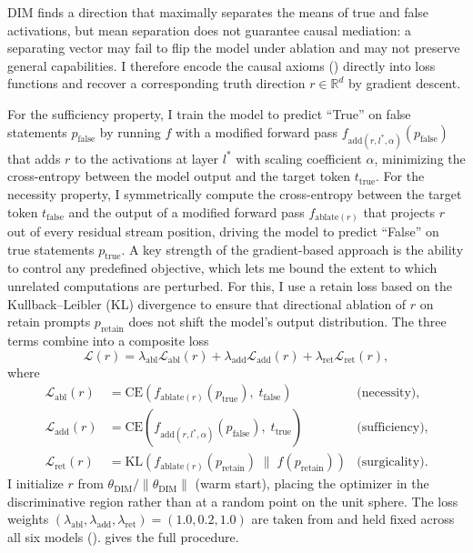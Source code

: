 \documentclass[sn-basic]{sn-jnl}
\newcommand{\dimv}{\theta_{\text{DIM}}}
\newcommand{\fablate}[1][\cdot]{f_{\text{ablate}(#1)}}
\newcommand{\fadd}[1][\cdot]{f_{\text{add}(#1,\alpha)}}
\newcommand{\Labl}{\mathcal{L}_{\text{abl}}}
\newcommand{\Ladd}{\mathcal{L}_{\text{add}}}
\newcommand{\Lret}{\mathcal{L}_{\text{ret}}}
\begin{document}
DIM finds a direction that maximally separates the means of true and false
activations, but mean separation does not guarantee causal mediation: a
separating vector may fail to flip the model under ablation and may not
preserve general capabilities. I therefore encode the causal axioms
() directly into loss functions and recover a corresponding
truth direction $r \in \mathbb{R}^{d}$ by gradient descent.

For the sufficiency property, I train the model to predict ``True'' on false
statements $p_{\text{false}}$ by running $f$ with a modified forward pass
$\fadd[r,l^{*}](p_{\text{false}})$ that adds $r$ to the activations at layer
$l^{*}$ with scaling coefficient $\alpha$, minimizing the cross-entropy between
the model output and the target token $t_{\text{true}}$. For the necessity
property, I symmetrically compute the cross-entropy between the target token
$t_{\text{false}}$ and the output of a modified forward pass
$\fablate[r]$ that projects $r$ out of every residual stream position,
driving the model to predict ``False'' on true statements $p_{\text{true}}$.
A key strength of the gradient-based approach is the ability to control any
predefined objective, which lets me bound the extent to which unrelated
computations are perturbed. For this, I use a retain loss based on the
Kullback--Leibler (KL) divergence to ensure that directional ablation of $r$
on retain prompts $p_{\text{retain}}$ does not shift the model's output
distribution. The three terms combine into a composite loss
\[
\mathcal{L}(r) =
   \lambda_{\text{abl}} \Labl(r)
 + \lambda_{\text{add}} \Ladd(r)
 + \lambda_{\text{ret}} \Lret(r),
\]
where
\begin{align*}
\Labl(r) &= \mathrm{CE}\!\left(f_{\text{ablate}(r)}(p_{\text{true}}),\;
                                t_{\text{false}}\right)
  &\text{(necessity)},\\
\Ladd(r) &= \mathrm{CE}\!\left(f_{\text{add}(r,l^{*},\alpha)}(p_{\text{false}}),\;
                                t_{\text{true}}\right)
  &\text{(sufficiency)},\\
\Lret(r) &= \mathrm{KL}\!\left(f_{\text{ablate}(r)}(p_{\text{retain}})\;\|\;
                                f(p_{\text{retain}})\right)
  &\text{(surgicality)}.
\end{align*}
I initialize $r$ from $\dimv / \|\dimv\|$ (warm start), placing the optimizer
in the discriminative region rather than at a random point on the unit sphere.
The loss weights $(\lambda_{\text{abl}}, \lambda_{\text{add}},
\lambda_{\text{ret}}) = (1.0, 0.2, 1.0)$ are taken from
\citet[Tab.~3]{wollschlagerGeometryRefusalLarge2025} and held fixed across all
six models ().  gives the full procedure.
\end{document}
